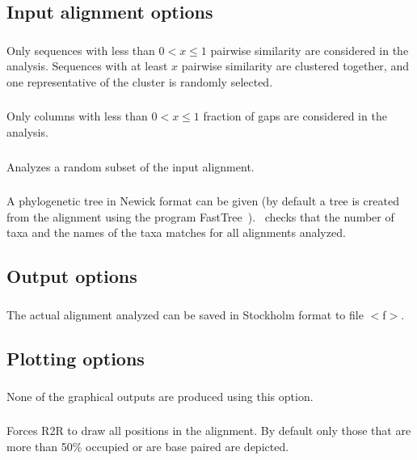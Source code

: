 \subsection{Input alignment options}

\subsubsection{} Only sequences with less than $0<x\leq 1$
pairwise similarity are considered in the analysis.  Sequences with at
least $x$ pairwise similarity are clustered together, and one
representative of the cluster is randomly selected.

\subsubsection{} Only columns with less than $0<x\leq 1$ fraction of gaps are considered in the analysis.

\subsubsection{} Analyzes a random subset of the input alignment.

\subsubsection{} A phylogenetic tree in Newick format can be given (by default a tree is created 
from the alignment using the program FastTree~\citep{Price10}).  \rscape\ checks that the  number of taxa and the names
of the taxa matches for all alignments analyzed.


\subsection{Output options}

\subsubsection{} The actual alignment analyzed can be saved in Stockholm format to file $<$f$>$.


\subsection{Plotting options}

\subsubsection{} None of the graphical outputs are produced using this option.


\subsubsection{} Forces R2R to draw all positions in the alignment. By default only
those that are more than 50\% occupied or are base paired are
depicted.













